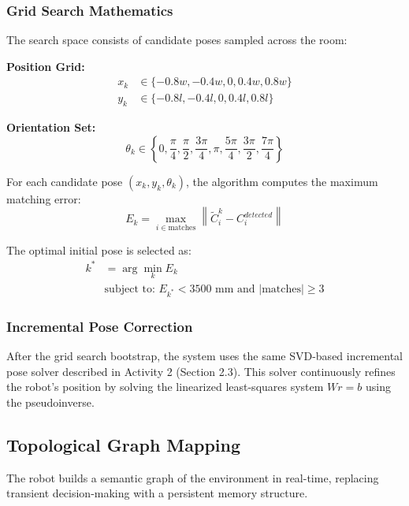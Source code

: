 \documentclass[conference]{IEEEtran}
\begin{document}
    \subsubsection{\textbf{Grid Search Mathematics}}
    The search space consists of candidate poses sampled across the room:

    \textbf{Position Grid:}
    \begin{align}
        x_k &\in \{-0.8w, -0.4w, 0, 0.4w, 0.8w\} \\
        y_k &\in \{-0.8l, -0.4l, 0, 0.4l, 0.8l\} \nonumber
    \end{align}

    \textbf{Orientation Set:}
    \begin{equation}
        \theta_k \in \left\{0, \frac{\pi}{4}, \frac{\pi}{2}, \frac{3\pi}{4}, \pi, \frac{5\pi}{4}, \frac{3\pi}{2}, \frac{7\pi}{4}\right\}
    \end{equation}

    For each candidate pose $(x_k, y_k, \theta_k)$, the algorithm computes the maximum matching error:
    \begin{equation}
        E_k = \max_{i \in \text{matches}} \left\| \tilde{C}_i^k - C_i^{detected} \right\|
    \end{equation}

    The optimal initial pose is selected as:
    \begin{align}
        k^* &= \arg\min_k E_k \\
        &\text{subject to: } E_{k^*} < 3500 \text{ mm and } |\text{matches}| \geq 3 \nonumber
    \end{align}

    \subsubsection{\textbf{Incremental Pose Correction}}
    After the grid search bootstrap, the system uses the same SVD-based incremental pose solver described in Activity 2 (Section 2.3). This solver continuously refines the robot's position by solving the linearized least-squares system $Wr = b$ using the pseudoinverse.
    \vspace{0.1cm}
    \subsection{Topological Graph Mapping}
    The robot builds a semantic graph of the environment in real-time, replacing transient decision-making with a persistent memory structure.
\end{document}
